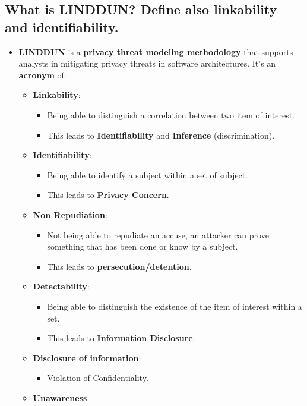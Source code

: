 \documentclass[9pt, letterpaper]{article}
\begin{document}
\subsection{What is LINDDUN? Define also linkability and identifiability.}
\begin{itemize}
	\item \textbf{LINDDUN} is a \textbf{privacy threat modeling methodology} that supports analysts in mitigating privacy threats in software architectures. It's an \textbf{acronym} of:
	\begin{itemize}
		\item \textbf{Linkability}: 
		\begin{itemize}
			\item Being able to distinguish a correlation between two item of interest.
			\item This leads to \textbf{Identifiability} and \textbf{Inference} (discrimination).
		\end{itemize}		
		\item \textbf{Identifiability}:
		\begin{itemize}
			\item Being able to identify a subject within a set of subject.
			\item This leads to \textbf{Privacy Concern}.
		\end{itemize}
		\item \textbf{Non Repudiation}: 
		\begin{itemize}
			\item Not being able to repudiate an accuse, an attacker can prove something that has been done or know by a subject.
			\item This leads to \textbf{persecution/detention}.
		\end{itemize}		
		\item \textbf{Detectability}: 
		\begin{itemize}
			\item Being able to distinguish the existence of the item of interest within a set.
			\item This leads to \textbf{Information Disclosure}.
		\end{itemize}		
		\item \textbf{Disclosure of information}:
		\begin{itemize}
			\item Violation of Confidentiality.
		\end{itemize}
		\item \textbf{Unawareness}:
		\begin{itemize}

\end{itemize}
\end{itemize}
\end{itemize}
\end{document}
